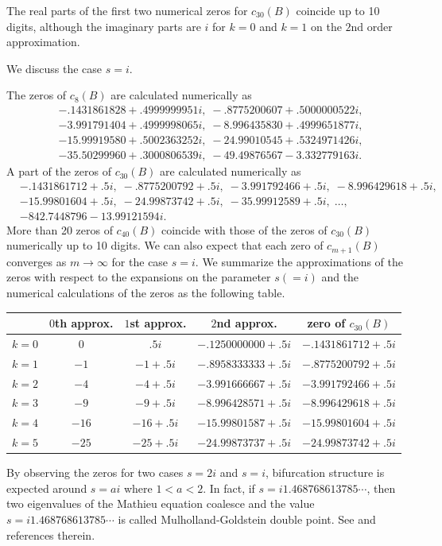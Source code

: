 \documentclass[12pt]{amsart}
\numberwithin{equation}{section}
\theoremstyle{definition}
\theoremstyle{remark}
\begin{document}
The real parts of the first two numerical zeros for $c_{30} (B)$ coincide up to 10 digits, although the imaginary parts are $i$ for $k=0$ and $k=1$ on the $2$nd order approximation. 

We discuss the case $s=i$.

The zeros of $c_{8} (B)$ are calculated numerically as
\begin{align*}
& -.1431861828+.4999999951 i , \; -.8775200607+.5000000522 i, \\
& -3.991791404+.4999998065 i, \; -8.996435830+.4999651877 i, \\
& -15.99919580+.5002363252 i , \; -24.99010545+.5324971426 i , \\
& -35.50299960+.3000806539 i , \; -49.49876567-3.332779163 i .
\end{align*}
A part of the zeros of $c_{30} (B)$ are calculated numerically as
\begin{align*}
& -.1431861712+.5 i , \; -.8775200792+.5 i , \; -3.991792466+.5 i , \; -8.996429618+.5 i  , \\
& -15.99801604+.5 i , \; -24.99873742+.5 i , \; -35.99912589+.5 i , \; \dots , \\
& -842.7448796-13.99121594 i .
\end{align*}
More than 20 zeros of $c_{40} (B)$ coincide with those of the zeros of $c_{30} (B)$ numerically up to 10 digits.
We can also expect that each zero of $c_{m+1} (B)$ converges as $m \to \infty $ for the case $s=i$.
We summarize the approximations of the zeros with respect to the expansions on the parameter $s(=i)$ and the numerical calculations of the zeros as the following table.
\begin{center}
\begin{tabular}{c|c|c|c|c}
& $0$th approx. & $1$st approx. & $2$nd approx. & zero of $ c_{30} (B) $ \\ \hline
$k=0$ & $0$ & $.5 i $ & $-.1250000000+.5i $ & $  -.1431861712+.5 i $ \\
$k=1$ & $-1$ & $-1 + .5 i $ & $-.8958333333+.5 i $ & $-.8775200792+.5 i $ \\
$k=2$ & $-4$ & $-4 + .5 i $ & $-3.991666667+.5 i $ & $-3.991792466+.5 i $ \\
$k=3$ & $-9$ & $-9 + .5 i $ & $-8.996428571+.5 i $ & $-8.996429618+.5 i $ \\
$k=4$ & $-16$ & $-16 + .5 i $ & $-15.99801587+.5 i $ & $-15.99801604+.5 i $ \\
$k=5$ & $-25$ & $-25 + .5 i $ & $-24.99873737+.5 i $ & $-24.99873742+.5 i $
\end{tabular}
\end{center}
By observing the zeros for two cases $s=2i$ and $s=i$, bifurcation structure is expected around $s=a i$ where $1<a<2$.
In fact, if $s = i 1.468768613785 \cdots $, then two eigenvalues of the Mathieu equation coalesce and the value $s = i 1.468768613785 \cdots $ is called Mulholland-Goldstein double point.
See \cite{BCZ} and references therein.
\end{document}
